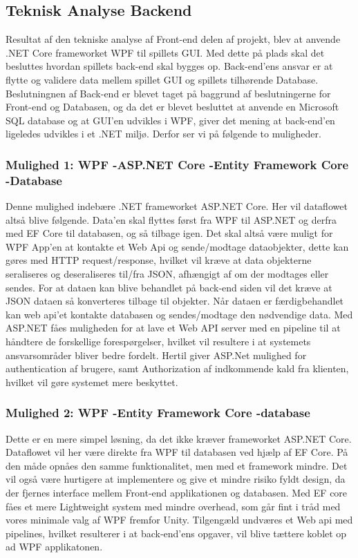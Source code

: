 \subsection{Teknisk Analyse Backend}

Resultat af den tekniske analyse af Front-end delen af projekt, blev at anvende .NET Core frameworket WPF til spillets GUI. Med dette på plads skal det besluttes hvordan spillets back-end skal bygges op. Back-end’ens ansvar er at flytte og validere data mellem spillet GUI og spillets tilhørende Database. Beslutningnen af Back-end er blevet taget på baggrund af beslutningerne for Front-end og Databasen, og da det er blevet besluttet at anvende en Microsoft SQL database og at GUI’en udvikles i WPF, giver det mening at back-end’en ligeledes udvikles i et .NET miljø. Derfor ser vi på følgende to muligheder.\\


\subsubsection{Mulighed 1: WPF -\g ASP.NET Core -\g Entity Framework Core -\g Database}
Denne mulighed indebære .NET frameworket ASP.NET Core. Her vil dataflowet altså blive følgende. Data’en skal flyttes først fra WPF til ASP.NET og derfra med EF Core til databasen, og så tilbage igen.
Det skal altså være muligt for WPF App’en at kontakte et Web Api og sende/modtage dataobjekter, dette kan gøres med HTTP request/response, hvilket vil kræve at data objekterne seraliseres og deseraliseres til/fra JSON, afhængigt af om der modtages eller sendes. For at dataen kan blive behandlet på back-end siden vil det kræve at JSON dataen så konverteres tilbage til objekter. Når dataen er færdigbehandlet kan web api’et kontakte databasen og sendes/modtage den nødvendige data. Med ASP.NET fåes muligheden for at lave et Web API server med en pipeline til at håndtere de forskellige forespørgelser, hvilket vil resultere i at systemets ansvarsområder bliver bedre fordelt. Hertil giver ASP.Net mulighed for authentication af brugere, samt Authorization af indkommende kald fra klienten, hvilket vil gøre systemet mere beskyttet. \\


\subsubsection{Mulighed 2: WPF -\g Entity Framework Core -\g database}

Dette er en mere simpel løsning, da det ikke kræver frameworket ASP.NET Core. Dataflowet vil her være direkte fra WPF til databasen ved hjælp af EF Core. På den måde opnåes den samme funktionalitet, men med et framework mindre. Det vil også være hurtigere at implementere og give et mindre risiko fyldt design, da der fjernes interface mellem Front-end applikationen og databasen. Med EF core fåes et mere Lightweight system med mindre overhead, som går fint i tråd med vores minimale valg af WPF fremfor Unity. Tilgengæld undværes et Web api med pipelines, hvilket resulterer i at back-end’ens opgaver, vil blive tættere koblet op ad WPF applikatonen.\\


